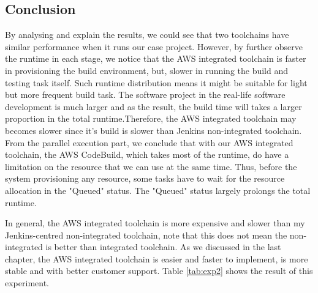 \subsection{Conclusion}
By analysing and explain the results, we could see that two toolchains have similar performance when it runs our case project. However, by further observe the runtime in each stage, we notice that the AWS integrated toolchain is faster in provisioning the build environment, but, slower in running the build and testing task itself. Such runtime distribution means it might be suitable for light but more frequent build task. 
The software project in the real-life software development is much larger and as the result, the build time will takes a larger proportion in the total runtime.Therefore, the AWS integrated toolchain may becomes slower since it's build is slower than Jenkins non-integrated toolchain.
From the parallel execution part, we conclude that with our AWS integrated toolchain, the AWS CodeBuild, which takes most of the runtime, do have a limitation on the resource that we can use at the same time. Thus, before the system provisioning any resource, some tasks have to wait for the resource allocation in the "Queued" status. The "Queued" status largely prolongs the total runtime. 
\par
In general, the AWS integrated toolchain is more expensive and slower than my Jenkins-centred non-integrated toolchain, note that this does not mean the non-integrated is better than integrated toolchain. As we discussed in the last chapter, the AWS integrated toolchain is easier and faster to implement, is more stable and with better customer support. Table \ref{tab:exp2} shows the result of this experiment.
